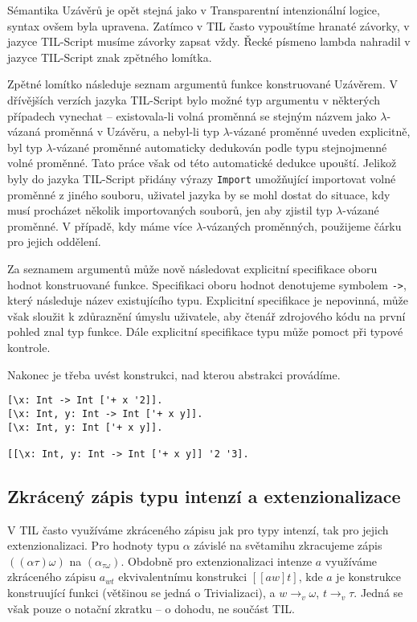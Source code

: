 Sémantika Uzávěrů je opět stejná jako v Transparentní intenzionální logice, syntax ovšem byla
upravena. Zatímco v TIL často vypouštíme hranaté závorky, v jazyce TIL-Script musíme závorky zapsat
vždy. Řecké písmeno lambda nahradil v jazyce TIL-Script znak zpětného lomítka.

Zpětné lomítko následuje seznam argumentů funkce konstruované Uzávěrem. V dřívějších verzích jazyka
TIL-Script bylo možné typ argumentu v některých případech vynechat -- existovala-li volná proměnná
se stejným názvem jako $\lambda$-vázaná proměnná v Uzávěru, a nebyl-li typ $\lambda$-vázané
proměnné uveden explicitně, byl typ $\lambda$-vázané proměnné automaticky dedukován podle typu
stejnojmenné volné proměnné. Tato práce však od této automatické dedukce upouští. Jelikož byly
do jazyka TIL-Script přidány výrazy \lstinline{Import} umožňující importovat volné proměnné z jiného
souboru, uživatel jazyka by se mohl dostat do situace, kdy musí procházet několik
importovaných souborů, jen aby zjistil typ $\lambda$-vázané proměnné. V případě, kdy máme více
$\lambda$-vázaných proměnných, použijeme čárku pro jejich oddělení.

Za seznamem argumentů může nově následovat explicitní specifikace oboru hodnot konstruované funkce.
Specifikaci oboru hodnot denotujeme symbolem \lstinline{->}, který následuje název existujícího
typu. Explicitní specifikace je nepovinná, může však sloužit k zdůraznění úmyslu uživatele, aby
čtenář zdrojového kódu na první pohled znal typ funkce. Dále explicitní specifikace typu může
pomoct při typové kontrole.

Nakonec je třeba uvést konstrukci, nad kterou abstrakci provádíme.

\begin{lstlisting}[caption={Příklad využití Uzávěrů}]
[\x: Int -> Int ['+ x '2]].
[\x: Int, y: Int -> Int ['+ x y]].
[\x: Int, y: Int ['+ x y]].

[[\x: Int, y: Int -> Int ['+ x y]] '2 '3].
\end{lstlisting}

\subsection{Zkrácený zápis typu intenzí a extenzionalizace}

V TIL často využíváme zkráceného zápisu jak pro typy intenzí, tak pro jejich extenzionalizaci.
Pro hodnoty typu $\alpha$ závislé na světamihu zkracujeme zápis $((\alpha\tau)\omega)$
na $(\alpha_{\tau\omega})$. Obdobně pro extenzionalizaci intenze $a$ využíváme zkráceného zápisu
$a_{wt}$ ekvivalentnímu konstrukci $[[a w] t]$, kde $a$ je konstrukce konstruující funkci
(většinou se jedná o Trivializaci), a $w \rightarrow_v \omega$, $t \rightarrow_v \tau$. Jedná
se však pouze o notační zkratku -- o dohodu, ne součást TIL.

